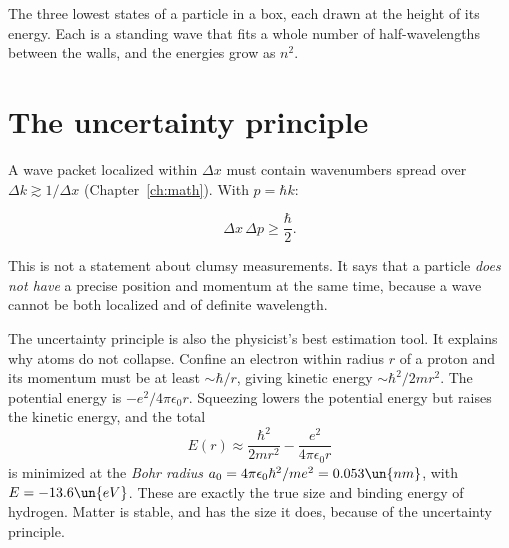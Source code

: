 \begin{center}
\begin{minipage}{\linewidth}\centering
{}

{\small The three lowest states of a particle in a box, each drawn at the height of its energy. Each is a standing wave that fits a whole number of half-wavelengths between the walls, and the energies grow as $n^2$.}
\end{minipage}
\end{center}

\section{The uncertainty principle}

A wave packet localized within $\Delta x$ must contain wavenumbers spread over $\Delta k\gtrsim1/\Delta x$ (Chapter~\ref{ch:math}). With $p = \hbar k$:

\begin{law}
\[
  \Delta x\,\Delta p\ge\frac{\hbar}{2}.
\]
\end{law}

This is not a statement about clumsy measurements. It says that a particle \emph{does not have} a precise position and momentum at the same time, because a wave cannot be both localized and of definite wavelength.

The uncertainty principle is also the physicist's best estimation tool. It explains why atoms do not collapse. Confine an electron within radius $r$ of a proton and its momentum must be at least $\sim\hbar/r$, giving kinetic energy $\sim\hbar^2/2mr^2$. The potential energy is $-e^2/4\pi\epsilon_0r$. Squeezing lowers the potential energy but raises the kinetic energy, and the total
\[
  E(r)\approx\frac{\hbar^2}{2mr^2} - \frac{e^2}{4\pi\epsilon_0r}
\]
is minimized at the \emph{Bohr radius} $a_0 = 4\pi\epsilon_0\hbar^2/me^2 = 0.053\un{nm}$, with $E = -13.6\un{eV}$. These are exactly the true size and binding energy of hydrogen. Matter is stable, and has the size it does, because of the uncertainty principle.

